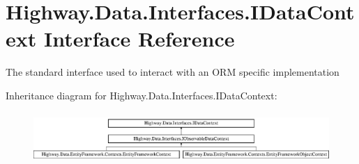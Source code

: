 \hypertarget{interface_highway_1_1_data_1_1_interfaces_1_1_i_data_context}{\section{Highway.\-Data.\-Interfaces.\-I\-Data\-Context Interface Reference}
\label{interface_highway_1_1_data_1_1_interfaces_1_1_i_data_context}
}


The standard interface used to interact with an O\-R\-M specific implementation  


Inheritance diagram for Highway.\-Data.\-Interfaces.\-I\-Data\-Context\-:\begin{figure}[H]
\begin{center}
\leavevmode
\includegraphics[height=1.971831cm]{interface_highway_1_1_data_1_1_interfaces_1_1_i_data_context}
\end{center}
\end{figure}
